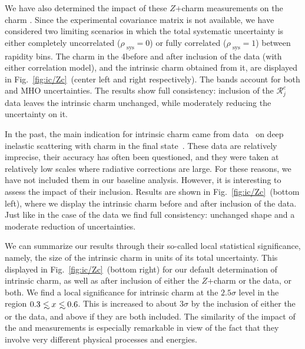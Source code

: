  We have also determined the impact of these \lhcb $Z$+charm measurements on the
charm \pdf.
%
Since the experimental covariance matrix is not available,
we have considered two limiting scenarios in which the total
systematic uncertainty is either completely uncorrelated 
($\rho_\textrm{ sys}=0$) or fully correlated  ($\rho_\textrm{ sys}=1$) between
 rapidity bins. The charm \pdf in the 4\fns before and after
inclusion of the \lhcb data (with either correlation model), and the intrinsic
charm \pdf obtained from it, are displayed in
Fig.~\ref{fig:ic/Zc}~(center left and right respectively).
%
The bands account for both \pdf and MHO uncertainties.
%
The results show full consistency: inclusion of the \lhcb  $\mathcal{R}_j^c$ data leaves
the intrinsic charm \pdf unchanged, while moderately reducing the
uncertainty on it.

In the past, the main indication for  intrinsic charm came from \emc data~\cite{Aubert:1982tt} on deep inelastic scattering with charm in the final state~\cite{Harris:1995jx}.
%
These data are relatively imprecise, their accuracy has often been questioned,
and they were taken at relatively low scales where radiative corrections are large.
%
For these reasons, we have not included them in our baseline
analysis.
%
However, it is interesting to assess the impact of
their inclusion.
%
Results are shown in 
Fig.~\ref{fig:ic/Zc}~(bottom left), where we display the
intrinsic charm \pdf before and after inclusion of the \emc data.
%
Just
like in the case of the \lhcb data we find full consistency: unchanged
shape and a moderate reduction of uncertainties.

We can summarize our results  through their so-called local statistical
significance, namely, the size of the intrinsic charm \pdf
in units of its total uncertainty.
%
This displayed  in Fig.~\ref{fig:ic/Zc}~(bottom right) for our default determination of
intrinsic charm, as well as after inclusion of either the \lhcb $Z$+charm or the
\emc data, or both.
%
We find a local significance for intrinsic charm at the $2.5\sigma$ level
in the region $0.3 \lsim x \lsim 0.6$.
%
This is increased to about
$3\sigma$ by the inclusion of either the \emc or the \lhcb
data, and above if they are both included.
%
The similarity of the impact of the \emc and \lhcb measurements is
especially remarkable in view of the fact that they involve very
different physical processes and energies.

